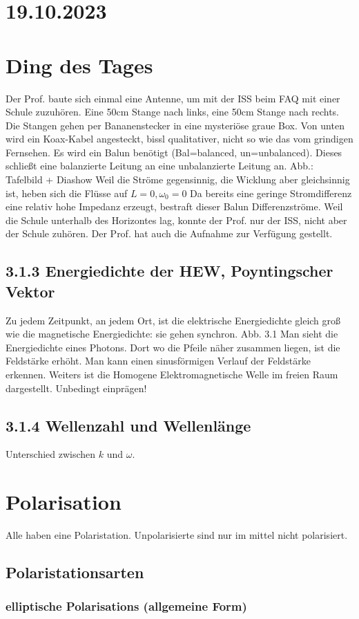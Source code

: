 \documentclass[a4paper]{article}
\begin{document}
\section*{19.10.2023}
\section*{Ding des Tages}
Der Prof. baute sich einmal eine Antenne, um mit der ISS beim FAQ mit einer Schule zuzuhören. Eine 50cm Stange nach links, eine 50cm Stange nach rechts. Die Stangen gehen per Bananenstecker in eine mysteriöse graue Box. Von unten wird ein Koax-Kabel angesteckt, bissl qualitativer, nicht so wie das vom grindigen Fernsehen.\newline
Es wird ein Balun benötigt (Bal=balanced, un=unbalanced). Dieses schließt eine balanzierte Leitung an eine unbalanzierte Leitung an.\newline
Abb.: Tafelbild + Diashow
Weil die Ströme gegensinnig, die Wicklung aber gleichsinnig ist, heben sich die Flüsse auf \implies $L=0, \omega_0=0$
Da bereits eine geringe Stromdifferenz eine relativ hohe Impedanz erzeugt, bestraft dieser Balun Differenzströme.\newline
Weil die Schule unterhalb des Horizontes lag, konnte der Prof. nur der ISS, nicht aber der Schule zuhören.
Der Prof. hat auch die Aufnahme zur Verfügung gestellt.

\subsection*{3.1.3 Energiedichte der HEW, Poyntingscher Vektor}
Zu jedem Zeitpunkt, an jedem Ort, ist die elektrische Energiedichte gleich groß wie die magnetische Energiedichte: sie gehen synchron.\newline
Abb. 3.1 Man sieht die Energiedichte eines Photons. Dort wo die Pfeile näher zusammen liegen, ist die Feldstärke erhöht. Man kann einen sinusförmigen Verlauf der Feldstärke erkennen.\newline
Weiters ist die Homogene Elektromagnetische Welle im freien Raum dargestellt. Unbedingt einprägen!\newline
\subsection*{3.1.4 Wellenzahl und Wellenlänge}
Unterschied zwischen $k$ und $\omega$.
\section*{Polarisation}
Alle haben eine Polaristation. Unpolarisierte sind nur im mittel nicht polarisiert.
\subsection*{Polaristationsarten}
\subsubsection*{elliptische Polarisations (allgemeine Form)}
\end{document}
